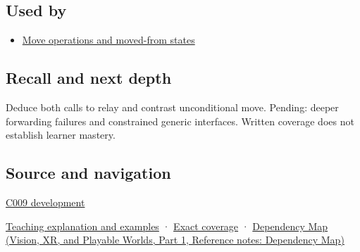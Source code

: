 \subsection{Used by}\label{appendix-0104b704fb11-used-by}

\hypertarget{appendix-0104b704fb11-used-by}{}

\begin{itemize}
\tightlist
\item
  \hyperref[appendix-5636651017c2]{Move operations and moved-from states}
\end{itemize}

\subsection{Recall and next depth}\label{appendix-0104b704fb11-recall-and-next-depth}

\hypertarget{appendix-0104b704fb11-recall-and-next-depth}{}

Deduce both calls to relay and contrast unconditional move. Pending: deeper forwarding failures and constrained generic interfaces. Written coverage does not establish learner mastery.

\subsection{Source and navigation}\label{appendix-0104b704fb11-source-and-navigation}

\hypertarget{appendix-0104b704fb11-source-and-navigation}{}

\hyperref[appendix-fd090d982a15-m009---parts-127-147]{C009 development}

\hyperref[01-foundations-i-ch003-move-permission-is-not-resource-transfer]{Teaching explanation and examples} · \hyperref[appendix-fd090d982a15-m008---parts-113-126]{Exact coverage} · \href{../07-Vision-XR-and-Playable-Worlds-P01/main.pdf\#appendix-4ad47bdd269a}{Dependency Map (Vision, XR, and Playable Worlds, Part 1, Reference notes: Dependency Map)}
